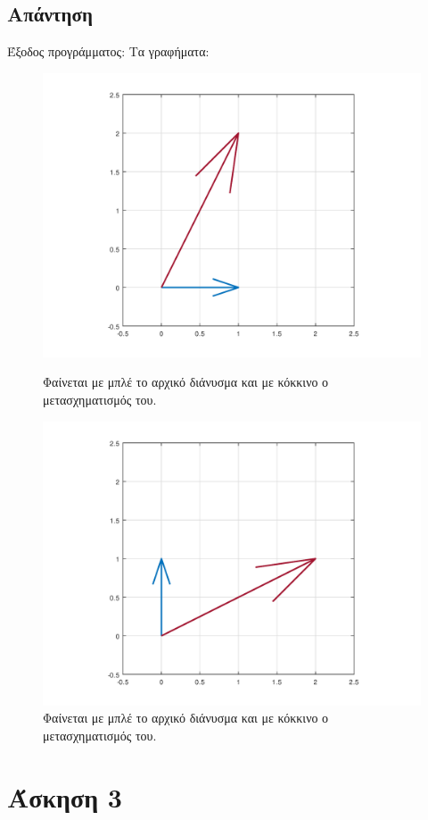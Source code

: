 \documentclass[a4paper,12pt]{article}
\begin{document}
\subsection{Απάντηση}
Έξοδος προγράμματος:
%
Τα γραφήματα:
\begin{figure}
	\centering
	\includegraphics[scale=0.6]{x1.png}
	\caption{Φαίνεται με μπλέ το αρχικό διάνυσμα και με κόκκινο ο μετασχηματισμός του.}
	\includegraphics[scale=0.6]{x2.png}
	\caption{Φαίνεται με μπλέ το αρχικό διάνυσμα και με κόκκινο ο μετασχηματισμός του.}
\end{figure}
\newpage\section{Άσκηση 3}
\end{document}
